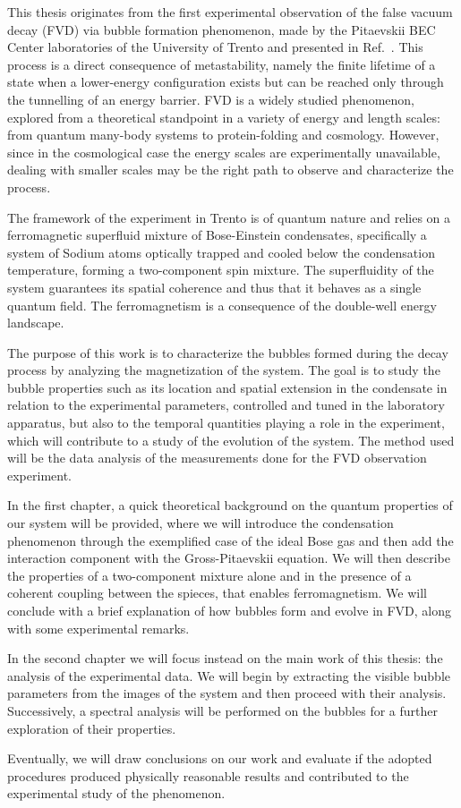 This thesis originates from the first experimental observation of the false vacuum decay (FVD) via bubble formation phenomenon, made by the Pitaevskii BEC Center laboratories of the University of Trento and presented in Ref.\ \cite{zenesini2024false}. This process is a direct consequence of metastability, namely the finite lifetime of a state when a lower-energy configuration exists but can be reached only through the tunnelling of an energy barrier. FVD is a widely studied phenomenon, explored from a theoretical standpoint in a variety of energy and length scales: from quantum many-body systems to protein-folding and cosmology. However, since in the cosmological case the energy scales are experimentally unavailable, dealing with smaller scales may be the right path to observe and characterize the process.

The framework of the experiment in Trento is of quantum nature and relies on a ferromagnetic superfluid mixture of Bose-Einstein condensates, specifically a system of Sodium atoms optically trapped and cooled below the condensation temperature, forming a two-component spin mixture. The superfluidity of the system guarantees its spatial coherence and thus that it behaves as a single quantum field. The ferromagnetism is a consequence of the double-well energy landscape.

The purpose of this work is to characterize the bubbles formed during the decay process by analyzing the magnetization of the system. The goal is to study the bubble properties such as its location and spatial extension in the condensate in relation to the experimental parameters, controlled and tuned in the laboratory apparatus, but also to the temporal quantities playing a role in the experiment, which will contribute to a study of the evolution of the system. The method used will be the data analysis of the measurements done for the FVD observation experiment.

In the first chapter, a quick theoretical background on the quantum properties of our system will be provided, where we will introduce the condensation phenomenon through the exemplified case of the ideal Bose gas and then add the interaction component with the Gross-Pitaevskii equation. We will then describe the properties of a two-component mixture alone and in the presence of a coherent coupling between the spieces, that enables ferromagnetism. We will conclude with a brief explanation of how bubbles form and evolve in FVD, along with some experimental remarks.

In the second chapter we will focus instead on the main work of this thesis: the analysis of the experimental data. We will begin by extracting the visible bubble parameters from the images of the system and then proceed with their analysis. Successively, a spectral analysis will be performed on the bubbles for a further exploration of their properties.

Eventually, we will draw conclusions on our work and evaluate if the adopted procedures produced physically reasonable results and contributed to the experimental study of the phenomenon.